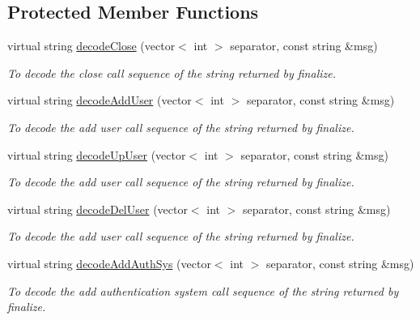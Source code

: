 \subsection*{Protected Member Functions}
\begin{DoxyCompactItemize}
\item 
virtual string \hyperlink{classUMSMapper_a145a0e6311e595394f5f07da1a3a989b}{decodeClose} (vector$<$ int $>$ separator, const string \&msg)
\begin{DoxyCompactList}\small\item\em To decode the close call sequence of the string returned by finalize. \item\end{DoxyCompactList}\item 
virtual string \hyperlink{classUMSMapper_a1f5caa2c4e02967efb3dc741813831a7}{decodeAddUser} (vector$<$ int $>$ separator, const string \&msg)
\begin{DoxyCompactList}\small\item\em To decode the add user call sequence of the string returned by finalize. \item\end{DoxyCompactList}\item 
virtual string \hyperlink{classUMSMapper_afc32e4e8ec824a76c57577d234a46f7c}{decodeUpUser} (vector$<$ int $>$ separator, const string \&msg)
\begin{DoxyCompactList}\small\item\em To decode the add user call sequence of the string returned by finalize. \item\end{DoxyCompactList}\item 
virtual string \hyperlink{classUMSMapper_a63cdc4905b7ad965c410cdccff455329}{decodeDelUser} (vector$<$ int $>$ separator, const string \&msg)
\begin{DoxyCompactList}\small\item\em To decode the add user call sequence of the string returned by finalize. \item\end{DoxyCompactList}\item 
virtual string \hyperlink{classUMSMapper_a461de6b19368a9ddc8dad36f42cf55c8}{decodeAddAuthSys} (vector$<$ int $>$ separator, const string \&msg)
\begin{DoxyCompactList}\small\item\em To decode the add authentication system call sequence of the string returned by finalize. \item\end{DoxyCompactList}\item 

\end{DoxyCompactItemize}
